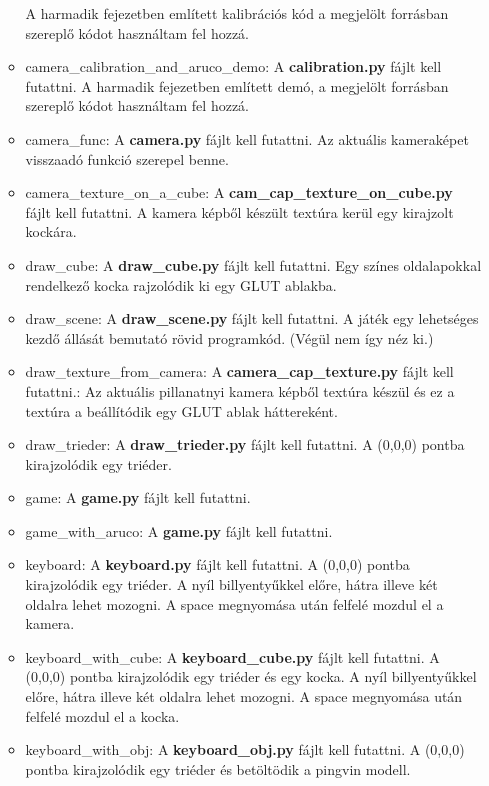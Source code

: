 \begin{itemize}
\begin{itemize}
A harmadik fejezetben említett kalibrációs kód a megjelölt forrásban szereplő kódot használtam fel hozzá. 
\item camera\_calibration\_and\_aruco\_demo:
A \textbf{calibration.py} fájlt kell futattni.
A harmadik fejezetben említett demó, a megjelölt forrásban szereplő kódot használtam fel hozzá. 
\item camera\_func:
A \textbf{camera.py} fájlt kell futattni.
Az aktuális kameraképet visszaadó funkció szerepel benne. 
\item camera\_texture\_on\_a\_cube:
A \textbf{cam\_cap\_texture\_on\_cube.py} fájlt kell futattni.
A kamera képből készült textúra kerül egy kirajzolt kockára.
\item draw\_cube:
A \textbf{draw\_cube.py} fájlt kell futattni.
Egy színes oldalapokkal rendelkező kocka rajzolódik ki egy GLUT ablakba.
\item draw\_scene:
A \textbf{draw\_scene.py} fájlt kell futattni.
A játék egy lehetséges kezdő állását bemutató rövid programkód.
(Végül nem így néz ki.)
\item draw\_texture\_from\_camera:
A \textbf{camera\_cap\_texture.py} fájlt kell futattni.:
Az aktuális pillanatnyi kamera képből textúra készül és ez a 
textúra a beállítódik egy GLUT ablak háttereként. 
\item draw\_trieder:
A \textbf{draw\_trieder.py} fájlt kell futattni.
A (0,0,0) pontba kirajzolódik egy triéder.
\item game:
A \textbf{game.py} fájlt kell futattni.
\item game\_with\_aruco:
A \textbf{game.py} fájlt kell futattni.
\item keyboard:
A \textbf{keyboard.py} fájlt kell futattni.
A (0,0,0) pontba kirajzolódik egy triéder. A nyíl billyentyűkkel előre, hátra illeve 
két oldalra lehet mozogni.
A space megnyomása után felfelé mozdul el a kamera.
\item keyboard\_with\_cube:
A \textbf{keyboard\_cube.py} fájlt kell futattni.
A (0,0,0) pontba kirajzolódik egy triéder és egy kocka. A nyíl billyentyűkkel előre, hátra illeve két oldalra lehet mozogni.
A space megnyomása után felfelé mozdul el a kocka.
\item keyboard\_with\_obj:
A \textbf{keyboard\_obj.py} fájlt kell futattni.
A (0,0,0) pontba kirajzolódik egy triéder és betöltödik a pingvin modell.


\end{itemize}
\end{itemize}
